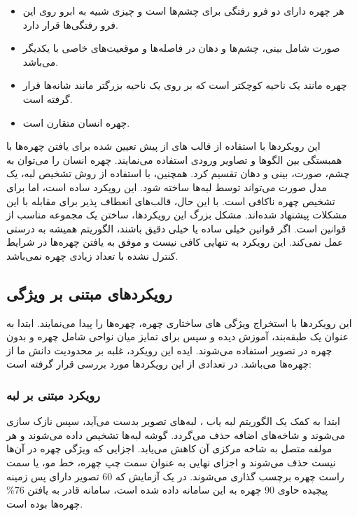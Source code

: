 \begin{itemize}
\item
هر چهره دارای دو فرو رفتگی برای چشم‌ها است و چیزی شبیه به ابرو روی این فرو رفتگی‌ها قرار دارد.
\item
صورت شامل بینی، چشم‌ها و دهان در فاصله‌ها و موقعیت‌های خاصی با یکدیگر می‌باشد.
\item
چهره مانند یک ناحیه کوچکتر است که بر روی یک ناحیه بزرگتر مانند شانه‌ها قرار گرفته است. 
\item
چهره انسان متقارن است.
\end{itemize} 

\noindent
این رویکردها با استفاده از قالب  ‌های از پیش تعیین شده برای یافتن چهره‌ها با همبستگی بین الگوها و تصاویر ورودی استفاده می‌نمایند. چهره انسان را می‌توان به چشم، صورت، بینی و دهان تقسیم کرد. همچنین، با استفاده از روش تشخیص لبه، یک مدل صورت می‌تواند توسط لبه‌ها ساخته شود. این رویکرد ساده است، اما برای تشخیص چهره ناکافی است. با این حال، قالب‌های انعطاف پذیر برای مقابله با این مشکلات پیشنهاد شده‌اند. مشکل بزرگ این رویکرد‌ها، ساختن یک مجموعه مناسب از قوانین است. اگر قوانین خیلی ساده یا خیلی دقیق باشند، الگوریتم همیشه به درستی عمل نمی‌کند. این رویکرد به تنهایی کافی نیست و موفق به یافتن چهره‌ها در شرایط کنترل نشده با تعداد زیادی چهره نمی‌باشد.


\subsection{رویکردهای مبتنی بر ویژگی}
این رویکردها‌ با استخراج ویژگی  ‌های ساختاری چهره، چهره‌ها را پیدا می‌نمایند. ابتدا به عنوان یک طبقه‌بند، آموزش دیده و سپس برای تمایز میان نواحی شامل چهره و بدون چهره در تصویر استفاده می‌شوند. ایده این رویکرد، غلبه بر محدودیت دانش ما از چهره‌ها می‌باشد. در \cite{HJELMAS2001236} تعدادی از این رویکردها مورد بررسی قرار گرفته است:

\subsubsection{رویکرد مبتنی بر لبه}
ابتدا به کمک یک الگوریتم لبه یاب ، لبه‌های تصویر بدست می‌آید، سپس نازک سازی می‌شوند و شاخه‌های اضافه حذف می‌گردد. گوشه لبه‌ها تشخیص داده می‌شوند و هر مولفه متصل  به شاخه مرکزی آن کاهش می‌یابد. اجزایی که ویژگی چهره در آن‌ها نیست حذف می‌شوند و اجزای نهایی به عنوان سمت چپ چهره، خط مو، یا سمت راست چهره برچسب گذاری می‌شوند. در یک آزمایش که 60 تصویر دارای پس زمینه پیچیده حاوی 90 چهره به این سامانه داده شده است، سامانه قادر به یافتن 76\% چهره‌ها بوده است.


